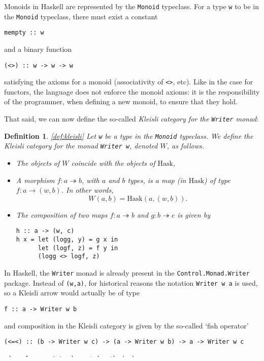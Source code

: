 \documentclass[11pt]{article}
\newtheorem{definition}{Definition}
\theoremstyle{nonumberplain}
\newcommand{\Hask}{\mathrm{Hask}}
\newcommand*\lsin{\lstinline}
\begin{document}
Monoids in Haskell are represented by the \lsin|Monoid| typeclass. For a type \lsin|w| to be in the \lsin|Monoid| typeclass, there must exist a constant
\begin{lstlisting}
mempty :: w
\end{lstlisting}
and a binary function
\begin{lstlisting}
(<>) :: w -> w -> w
\end{lstlisting}
satisfying the axioms for a monoid (associativity of \lsin|<>|, etc). Like in the case for functors, the language does not enforce the monoid axioms: it is the responsibility of the programmer, when defining a new monoid, to ensure that they hold.

That said, we can now define the so-called \emph{Kleisli category for the \lsin|Writer| monad}:

\begin{definition}\ref{def:kleisli}
Let \lsin|w| be a type in the \lsin|Monoid| typeclass. We define \emph{the Kleisli category for the monad \lsin|Writer w|}, denoted $W$, as follows.
\begin{itemize}
\item The objects of $W$ coincide with the objects of $\Hask$,
\item A morphism $f \colon a \twoheadrightarrow b$, with $a$ and $b$ types, is a map (in $\Hask$) of type $f \colon a \to (w, b)$. In other words,
\begin{equation}
W(a,b) = \Hask(a, (w,b)).
\end{equation}
\item The composition of two maps $f \colon a \twoheadrightarrow b$ and $g \colon b \twoheadrightarrow c$ is given by
\begin{lstlisting}
h :: a -> (w, c)
h x = let (logg, y) = g x in
      let (logf, z) = f y in
      (logg <> logf, z)
\end{lstlisting}
\end{itemize}
\end{definition}

In Haskell, the \lsin|Writer| monad is already present in the \lsin|Control.Monad.Writer| package. Instead of \lsin|(w,a)|, for historical reasons the notation \lsin|Writer w a| is used, so a Kleisli arrow would actually be of type
\begin{lstlisting}
f :: a -> Writer w b
\end{lstlisting} 
and composition in the Kleisli category is given by the so-called `fish operator'
\begin{lstlisting}
(<=<) :: (b -> Writer w c) -> (a -> Writer w b) -> a -> Writer w c
\end{lstlisting}
where \lsin|f <=< g| is implemented as the \lsin|h| above.
\end{document}
